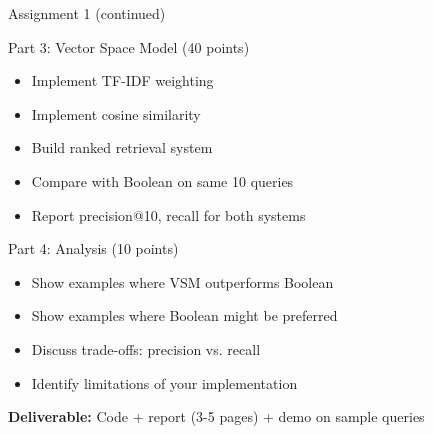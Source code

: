 \documentclass[aspectratio=169]{beamer}
\newif\ifanimated
\newcommand{\cpause}{\ifanimated\pause\fi}
\begin{document}
\begin{frame}[shrink=5]{Assignment 1 (continued)}
\begin{block}{Part 3: Vector Space Model (40 points)}
\begin{itemize}
    \item Implement TF-IDF weighting
    \item Implement cosine similarity
    \item Build ranked retrieval system
    \item Compare with Boolean on same 10 queries
    \item Report precision@10, recall for both systems
\end{itemize}
\cpause
\end{block}
\cpause
\begin{block}{Part 4: Analysis (10 points)}
\begin{itemize}
    \item Show examples where VSM outperforms Boolean
    \item Show examples where Boolean might be preferred
    \item Discuss trade-offs: precision vs. recall
    \item Identify limitations of your implementation
\end{itemize}
\end{block}
\vspace{1em}

\textbf{Deliverable:} Code + report (3-5 pages) + demo on sample queries
\end{frame}
\end{document}
